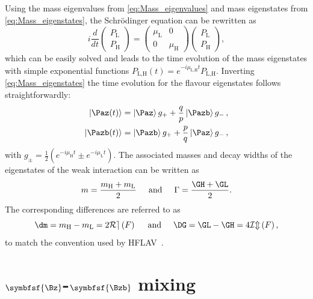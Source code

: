 Using the mass eigenvalues from \cref{eq:Mass_eigenvalues} and mass eigenstates from \cref{eq:Mass_eigenstates}, the Schrödinger equation can be rewritten as
\begin{equation}
i\frac{d}{dt}\begin{pmatrix} P_\text{L} \\ P_\text{H} \end{pmatrix} = \begin{pmatrix} \mu_\text{L} & 0 \\ 0 & \mu_\text{H} \end{pmatrix}\begin{pmatrix} P_\text{L} \\ P_\text{H} \end{pmatrix},
\end{equation}
which can be easily solved and leads to the time evolution of the mass eigenstates with simple exponential functions $P_\text{L,H}(t)=e^{-i\mu_\text{L,H}t}P_\text{L,H}$.
Inverting \cref{eq:Mass_eigenstates} the time evolution for the flavour eigenstates follows straightforwardly:
\begin{equation}
\begin{split}
\left|\Paz\!\left(t\right)\right>&=\left|\Paz\right>g_++\frac{q}{p}\left|\Pazb\right>g_-\,,\\
\left|\Pazb\!\left(t\right)\right>&=\left|\Pazb\right>g_++\frac{p}{q}\left|\Paz\right>g_-\,,\label{eq:timeEvolution}
\end{split}
\end{equation}
with $g_\pm=\frac{1}{2}\left(e^{-i\mu_\text{H}t}\pm e^{-i\mu_\text{L}t}\right)$.
The associated masses and decay widths of the eigenstates of the weak interaction can be written as
\begin{equation}
m=\frac{m_\text{H}+m_\text{L}}{2}\hspace{0.5cm}\text{and}\hspace{0.5cm}\Gamma=\frac{\GH+\GL}{2}.
\end{equation}
The corresponding differences are referred to as
\begin{equation}
\dm=m_\text{H}-m_\text{L}=2\mathcal{Re}\left(F\right)\hspace{0.5cm}\text{and}\hspace{0.5cm}\DG=\GL-\GH=4\mathcal{Im}\left(F\right)\label{eq:define_dmAndDG},
\end{equation}
to match the convention used by \ac{HFLAV}~\cite{HFLAV2016}.

\section[head={\Bz-\Bzb mixing},tocentry={\Bz-\Bzb mixing}]{$\symbfsf{\Bz}$-$\symbfsf{\Bzb}$ mixing}
\label{sec:BBbarMixing}

